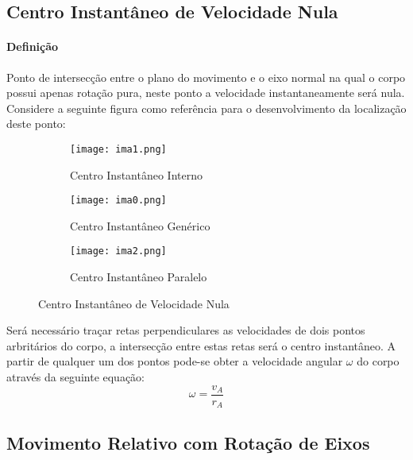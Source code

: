 \documentclass{article}
\begin{document}
        \subsection{Centro Instantâneo de Velocidade Nula}
            \paragraph{Definição}Ponto de intersecção entre o plano do movimento e o eixo normal na qual o corpo possui apenas rotação pura, neste ponto a velocidade instantaneamente será nula. Considere a seguinte figura como referência para o desenvolvimento da localização deste ponto:
                \begin{figure}[H]
                    \centering
                    \begin{subfigure}[]{0.3\textwidth}
                        \centering
                        \texttt{[image: ima1.png]}
                        \caption{Centro Instantâneo Interno}
                    \end{subfigure}
                    \begin{subfigure}[]{0.3\textwidth}
                        \centering
                        \texttt{[image: ima0.png]}
                        \caption{Centro Instantâneo Genérico}
                    \end{subfigure}
                    \begin{subfigure}[]{0.3\textwidth}
                        \centering
                        \texttt{[image: ima2.png]}
                        \caption{Centro Instantâneo Paralelo}
                    \end{subfigure}
                    \caption{Centro Instantâneo de Velocidade Nula}
                \end{figure} \noindent
            Será necessário traçar retas perpendiculares as velocidades de dois pontos arbritários do corpo, a intersecção entre estas retas será o centro instantâneo. A partir de qualquer um dos pontos pode-se obter a velocidade angular $\omega$ do corpo através da seguinte equação:
                \begin{equation}
                    \boxed{
                        \omega = \frac{v_{A}}{r_{A}}
                    }
                \end{equation}

        \subsection{Movimento Relativo com Rotação de Eixos}
\end{document}
